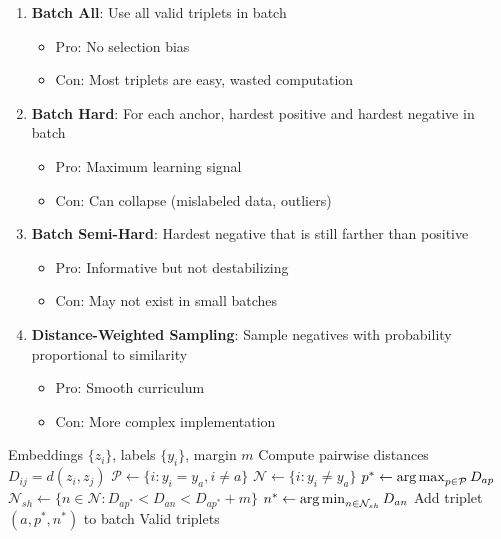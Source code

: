 \begin{enumerate}
    \item \textbf{Batch All}: Use all valid triplets in batch
    \begin{itemize}
        \item Pro: No selection bias
        \item Con: Most triplets are easy, wasted computation
    \end{itemize}
    
    \item \textbf{Batch Hard}: For each anchor, hardest positive and hardest negative in batch
    \begin{itemize}
        \item Pro: Maximum learning signal
        \item Con: Can collapse (mislabeled data, outliers)
    \end{itemize}
    
    \item \textbf{Batch Semi-Hard}: Hardest negative that is still farther than positive
    \begin{itemize}
        \item Pro: Informative but not destabilizing
        \item Con: May not exist in small batches
    \end{itemize}
    
    \item \textbf{Distance-Weighted Sampling}: Sample negatives with probability proportional to similarity
    \begin{itemize}
        \item Pro: Smooth curriculum
        \item Con: More complex implementation
    \end{itemize}
\end{enumerate}

\begin{algorithm}[H]
\caption{Batch Semi-Hard Mining}
\begin{algorithmic}[1]
\REQUIRE Embeddings $\{z_i\}$, labels $\{y_i\}$, margin $m$
\STATE Compute pairwise distances $D_{ij} = d(z_i, z_j)$
    \STATE $\mathcal{P} \gets \{i : y_i = y_a, i \neq a\}$ 
    \STATE $\mathcal{N} \gets \{i : y_i \neq y_a\}$ 
    \STATE $p^* \gets \operatorname*{arg\,max}_{p \in \mathcal{P}} D_{ap}$ 
    \STATE $\mathcal{N}_{sh} \gets \{n \in \mathcal{N} : D_{ap^*} < D_{an} < D_{ap^*} + m\}$ 
        \STATE $n^* \gets \operatorname*{arg\,min}_{n \in \mathcal{N}_{sh}} D_{an}$ 
        \STATE Add triplet $(a, p^*, n^*)$ to batch
    \ENDIF
\ENDFOR
\RETURN Valid triplets
\end{algorithmic}
\end{algorithm}

